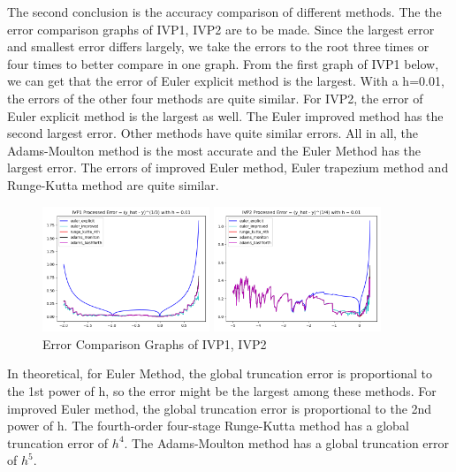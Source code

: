 \documentclass[a4paper]{article}
\begin{document}
      
   The second conclusion is the accuracy comparison of different methods. The the error comparison graphs of IVP1, IVP2 are to be made. Since the largest error and smallest error differs largely, we take the errors to the root three times or four times to better compare in one graph. 
   From the first graph of IVP1 below, we can get that the error of Euler explicit method is the  largest. With a h=0.01, the errors of the other four methods are quite similar. 
   For IVP2, the error of Euler explicit method is the largest as well. The Euler improved method has the second largest error. Other methods have quite similar errors.
   All in all, the Adams-Moulton method is the most accurate and the Euler Method has the largest error. The errors of improved Euler method, Euler trapezium method and Runge-Kutta method are quite similar. 
   
   
    \begin{figure}[htbp]
    \subfigure 
    {
    	\begin{minipage}{7cm}
    	 \centering      
    		\includegraphics[width=5cm]{img/ivp1_error.png}
    		\caption{\label{fig:ivp1_error} }
    	\end{minipage}
    }
    \subfigure 
    {
    	\begin{minipage}{7cm}
    	\centering      
    		\includegraphics[width=5cm]{img/ivp2_error.png}
    		\caption{\label{fig:ivp2_error}}
    	\end{minipage}
    }
    \caption{Error Comparison Graphs of IVP1, IVP2} 
    \end{figure}

   In theoretical, for Euler Method, the global truncation error is proportional to the 1st power of h, so the error might be the largest among these methods. For improved Euler method, the global truncation error is proportional to the 2nd power of h. The fourth-order four-stage Runge-Kutta method has a global truncation error of $h^4$. The Adams-Moulton method has a global truncation error of $h^5$.
   
\end{document}
